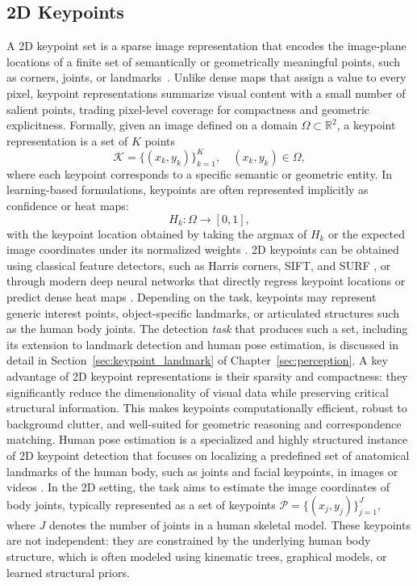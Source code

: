 \subsection{2D Keypoints}
\label{subsec:p-2-sec-4-2D-2d-keypoints}
A 2D keypoint set is a sparse image representation that encodes the image-plane locations of a finite set of semantically or geometrically meaningful points, such as corners, joints, or landmarks~\cite{szeliski2022}.
Unlike dense maps that assign a value to every pixel, keypoint representations summarize visual content with a small number of salient points, trading pixel-level coverage for compactness and geometric explicitness.
Formally, given an image defined on a domain
$\Omega \subset \mathbb{R}^2$, a keypoint representation is a set of $K$ points
\begin{equation}
\mathcal{K} = \{(x_k, y_k)\}_{k=1}^{K}, \quad (x_k, y_k) \in \Omega,
\end{equation}
where each keypoint corresponds to a specific semantic or geometric entity. 
In learning-based formulations, keypoints are often represented implicitly as confidence or heat maps:
\begin{equation}
H_k : \Omega \rightarrow [0,1],
\end{equation}
with the keypoint location obtained by taking the argmax of $H_k$ or the expected image coordinates under its normalized weights \cite{newell2016stacked}. 
2D keypoints can be obtained using classical feature detectors, such as Harris corners, SIFT, and SURF \cite{harris1988combined,lowe2004distinctive}, or through modern deep neural networks that directly regress keypoint locations or predict dense heat maps \cite{toshev2014deeppose,newell2016stacked}.
Depending on the task, keypoints may represent generic interest points, object-specific landmarks, or articulated structures such as the human body joints.
The detection \emph{task} that produces such a set, including its extension to landmark detection and human pose estimation, is discussed in detail in Section~\ref{sec:keypoint_landmark} of Chapter~\ref{sec:perception}.
A key advantage of 2D keypoint representations is their sparsity and compactness: they significantly reduce the dimensionality of visual data while preserving critical structural information. 
This makes keypoints computationally efficient, robust to background clutter, and well-suited for geometric reasoning and correspondence matching.
Human pose estimation is a specialized and highly structured instance of 2D keypoint detection that focuses on localizing a predefined set of anatomical landmarks of the human body, such as joints and facial keypoints, in images or videos \cite{zheng2022pose}. 
In the 2D setting, the task aims to estimate the image coordinates of body joints, typically represented as a set of keypoints
$\mathcal{P} = \{(x_j, y_j)\}_{j=1}^{J}$, where $J$ denotes the number of joints in a human skeletal model. 
These keypoints are not independent: they are constrained by the underlying human body structure, which is often modeled using kinematic trees, graphical models, or learned
structural priors.


